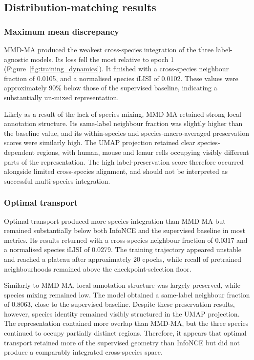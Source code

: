\documentclass{article}
\begin{document}
\subsection{Distribution-matching results}

\subsubsection{Maximum mean discrepancy}

MMD-MA produced the weakest cross-species integration of the three label-agnostic models. Its loss fell the most relative to epoch 1 (Figure~\ref{fig:training_dynamics}). It finished with a cross-species neighbour fraction of 0.0105, and a normalised species iLISI of 0.0102. These values were approximately 90\% below those of the supervised baseline, indicating a substantially un-mixed representation.

Likely as a result of the lack of species mixing, MMD-MA retained strong local annotation structure. Its same-label neighbour fraction was slightly higher than the baseline value, and its within-species and species-macro-averaged preservation scores were similarly high. The UMAP projection retained clear species-dependent regions, with human, mouse and lemur cells occupying visibly different parts of the representation. The high label-preservation score therefore occurred alongside limited cross-species alignment, and should not be interpreted as successful multi-species integration.

\subsubsection{Optimal transport}

Optimal transport produced more species integration than MMD-MA but remained substantially below both InfoNCE and the supervised baseline in most metrics. Its results returned with a cross-species neighbour fraction of 0.0317 and a normalised species iLISI of 0.0279. The training trajectory appeared unstable and reached a plateau after approximately 20 epochs, while recall of pretrained neighbourhoods remained above the checkpoint-selection floor.

Similarly to MMD-MA, local annotation structure was largely preserved, while species mixing remained low. The model obtained a same-label neighbour fraction of 0.8063, close to the supervised baseline. Despite these preservation results, however, species identity remained visibly structured in the UMAP projection. The representation contained more overlap than MMD-MA, but the three species continued to occupy partially distinct regions. Therefore, it appears that optimal transport retained more of the supervised geometry than InfoNCE but did not produce a comparably integrated cross-species space.
\end{document}
